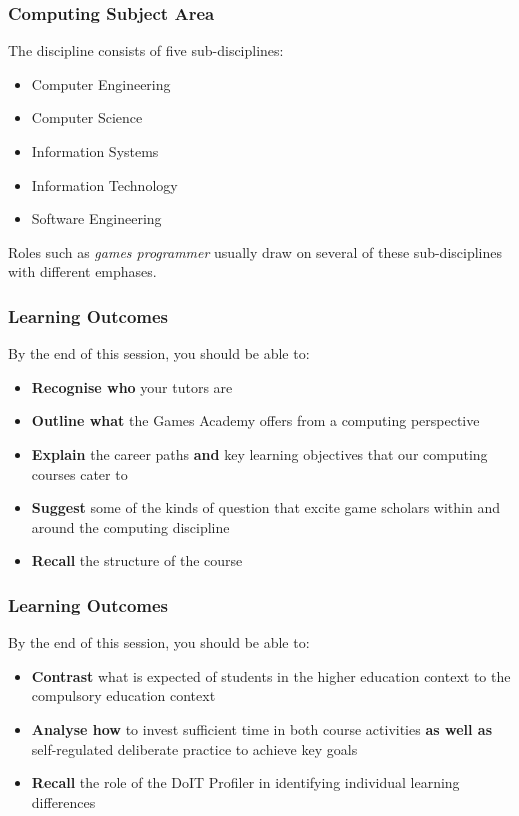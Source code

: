 \begin{frame}
	\frametitle{Computing Subject Area}
	
	The discipline consists of five sub-disciplines:
	
	\begin{itemize}
		\item Computer Engineering
		\item Computer Science
		\item Information Systems
		\item Information Technology
		\item Software Engineering	
	\end{itemize}

	Roles such as \textit{games programmer} usually draw on several of these sub-disciplines with different emphases.

\end{frame}

\begin{frame}
	\frametitle{Learning Outcomes}
	
	By the end of this session, you should be able to:
	
	\begin{itemize}
		\item \textbf{Recognise who} your tutors are
		\item \textbf{Outline what} the Games Academy offers from a computing perspective
		\item \textbf{Explain} the career paths \textbf{and} key learning objectives that our computing courses cater to
		\item \textbf{Suggest} some of the kinds of question that excite game scholars within and around the computing discipline
		\item \textbf{Recall} the structure of the course
	\end{itemize}
\end{frame}

\begin{frame}
	\frametitle{Learning Outcomes}
	
	By the end of this session, you should be able to:
	
	\begin{itemize}
		\item \textbf{Contrast} what is expected of students in the higher education context to the compulsory education context
		\item \textbf{Analyse how} to invest sufficient time in both course activities \textbf{as well as} self-regulated deliberate practice to achieve key goals
		\item \textbf{Recall} the role of the DoIT Profiler in identifying individual learning differences
	\end{itemize}
\end{frame}

